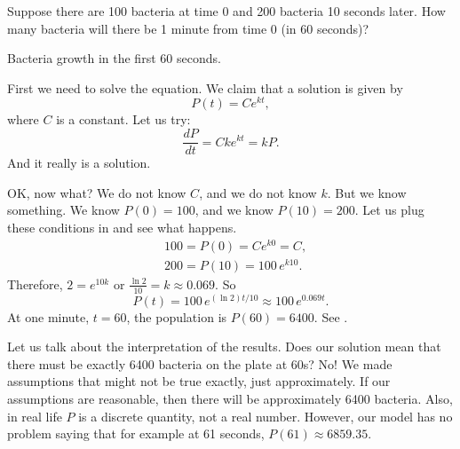 \begin{example}
Suppose there are 100 bacteria at time 0 and 200 bacteria 10 seconds later.
How many bacteria will there be 1 minute from time 0 (in 60 seconds)?

\begin{mywrapfig}{3.25in}
\capstart
{}
\caption{Bacteria growth in the first 60 seconds.\label{intro:plotbactfig}}
\end{mywrapfig}
%
%
First we need to solve the equation.  We claim that a solution is given by
\begin{equation*}
P(t) = C e^{kt} ,
\end{equation*}
where $C$ is a constant.  Let us try:
\begin{equation*}
\frac{dP}{dt} = C k e^{kt} = k P .
\end{equation*}
And it really is a solution.

OK\@, now what?  We do not know $C$, and we do not know $k$.  But we know
something.  We know $P(0) = 100$, and we know 
$P(10) = 200$.  Let us plug these conditions in and see what happens.
\begin{align*}
& 100 = P(0) = C e^{k0} = C ,\\
& 200 = P(10) = 100 \, e^{k10} .
\end{align*}
Therefore, $2 = e^{10k}$ or $\frac{\ln 2}{10} = k \approx 0.069$.
So 
\begin{equation*}
P(t) = 100 \, e^{(\ln 2) t / 10} \approx 100 \, e^{0.069 t} .
\end{equation*}
At one minute, $t=60$, the population is $P(60) = 6400$.  See
.




Let us talk about the interpretation of the results.  Does our solution
mean that
there must be exactly 6400 bacteria on the plate at 60s?  No!  We made
assumptions that might not be true exactly, just approximately.
If our assumptions are reasonable,
then there will be approximately 6400 bacteria.
Also, in real life $P$ is a
discrete quantity, not a real number.  However, our model has no problem saying
that for example at 61 seconds, $P(61) \approx 6859.35$.
\end{example}

